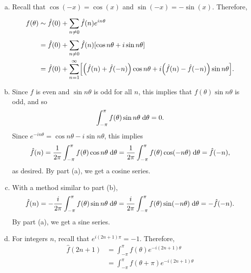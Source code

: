 \begin{exrc}[2]
\begin{soln}
    \begin{enumerate}[(a)]
    \item
        Recall that \(\cos(-x) = \cos(x)\) and \(\sin(-x) = -\sin(x)\).
        Therefore,
        \begin{align*}
            f(\theta)
            & \sim \hat{f}(0) + \sum_{n \neq 0}^{} \hat{f}(n) e^{in\theta} \\
            &= \hat{f}(0) + \sum_{n \neq 0}^{} \hat{f}(n) \sqbr{\cos n\theta + i \sin n\theta} \\
            &= \hat{f}(0) + \sum_{n = 1}^{\infty} \sqbr{\lrb{\hat{f}(n) + \hat{f}(-n)} \cos n\theta
            + i\lrb{\hat{f}(n) - \hat{f}(-n)} \sin n\theta }.
        \end{align*}
    \item
        Since \(f\) is even and \(\sin n \theta\) is odd for all \(n\),
        this implies that \(f(\theta) \sin n\theta\) is odd,
        and so 
        \begin{equation*}
            \int_{-\pi}^{\pi} f(\theta) \sin n\theta \;\mathrm d \theta = 0.
        \end{equation*}
        Since \(e^{-in\theta} = \cos n\theta - i \sin n\theta\), this implies
        \begin{equation*}
            \hat{f}(n)
            = \frac{1}{2\pi} \int_{-\pi}^{\pi} f(\theta) \cos n\theta \;\mathrm d \theta
            = \frac{1}{2\pi} \int_{-\pi}^{\pi} f(\theta) \cos (-n\theta) \;\mathrm d \theta
            = \hat{f}(-n),
        \end{equation*}
        as desired.
        By part (a), we get a cosine series.
    \item
        With a method similar to part (b),
        \begin{equation*}
            \hat{f}(n) = -\frac{i}{2\pi} \int_{-\pi}^{\pi} f(\theta) \sin n\theta \;\mathrm d \theta
            = \frac{i}{2\pi} \int_{-\pi}^{\pi} f(\theta) \sin(-n\theta) \;\mathrm d \theta
            = -\hat{f}(-n).
        \end{equation*}
        By part (a), we get a sine series.
    \item
        For integers \(n\), recall that \(e^{i(2n + 1)\pi} = -1\).
        Therefore,
        \begin{align*}
            \hat{f}(2n + 1) 
            &= \int_{-\pi}^{\pi} f(\theta) e^{-i(2n + 1)\theta}\\
            &= \int_{-\pi}^{\pi} f(\theta + \pi) e^{-i(2n + 1)\theta} \\

\end{align*}
\end{enumerate}
\end{soln}
\end{exrc}
